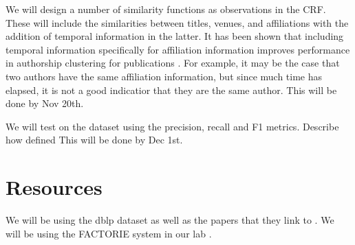\documentclass[]{article}
\begin{document}
We will design a number of similarity functions as observations in the CRF. These will include the similarities between titles, venues, and affiliations with the addition of temporal information in the latter. It has been shown that including temporal information specifically for affiliation information improves performance in authorship clustering for publications \cite{DBLP:journals/fcsc/LiDMS12}. For example, it may be the case that two authors have the same affiliation information, but since much time has elapsed, it is not a good indicatior that they are the same author.
This will be done by Nov 20th.

We will test on the dataset using the precision, recall and F1 metrics. {\color{red} Describe how defined } 
This will be done by Dec 1st.

\section{Resources} %
\label{sec:resources}
We will be using the dblp dataset as well as the papers that they link to \cite{ley2002dblp}. We will be using the FACTORIE system in our lab \cite{mccallum2009factorie}. 



\end{document}
